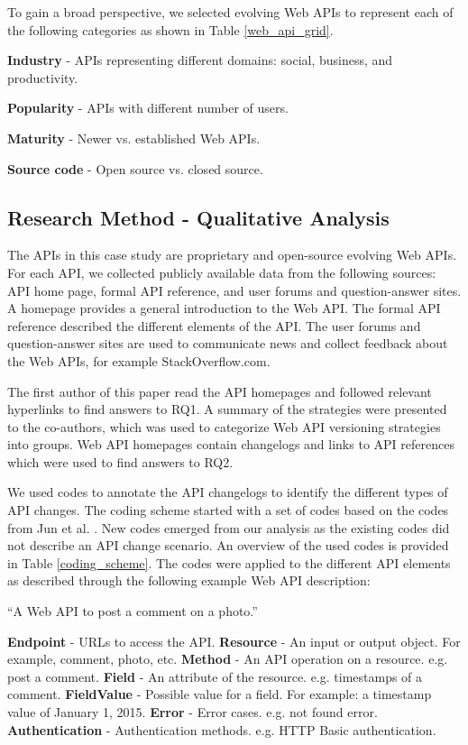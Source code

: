 To gain a broad perspective, we selected evolving Web APIs to represent each of the following categories as shown in Table \ref{web_api_grid}.

\textbf{Industry} - APIs representing different domains: social, business, and productivity.

\textbf{Popularity} - APIs with different number of users.

\textbf{Maturity} - Newer vs. established Web APIs.

\textbf{Source code} - Open source vs. closed source.


\subsection{Research Method - Qualitative Analysis} %
\label{sub:research_method}

The APIs in this case study are proprietary and open-source evolving Web APIs. For each API, we collected publicly available data from the following sources: API home page, formal API reference, and user forums and question-answer sites. A homepage provides a general introduction to the Web API. The formal API reference described the different elements of the API. The user forums and question-answer sites are used to communicate news and collect feedback about the Web APIs, for example StackOverflow.com.

The first author of this paper read the API homepages and followed relevant hyperlinks to find answers to RQ1. A summary of the strategies were presented to the co-authors, which was used to categorize Web API versioning strategies into groups. Web API homepages contain changelogs and links to API references which were used to find answers to RQ2.

We used codes to annotate the API changelogs to identify the different types of API changes. The coding scheme started with a set of codes based on the codes from Jun et al. \cite{li_client_2013}. New codes  emerged from our analysis as the existing codes did not describe an API change scenario. An overview of the used codes is provided in Table \ref{coding_scheme}. The codes were applied to the different API elements as described through the following example Web API description:

``A Web API to post a comment on a photo.''

\textbf{Endpoint} - URLs to access the API.
\textbf{Resource} - An input or output object. For example, comment, photo, etc.
\textbf{Method} - An API operation on a resource. e.g. post a comment.
\textbf{Field} - An attribute of the resource. e.g. timestamps of a comment.
\textbf{FieldValue} - Possible value for a field. For example: a timestamp value of January 1, 2015.
\textbf{Error} - Error cases. e.g. not found error.
\textbf{Authentication} - Authentication methods. e.g. HTTP Basic authentication.


